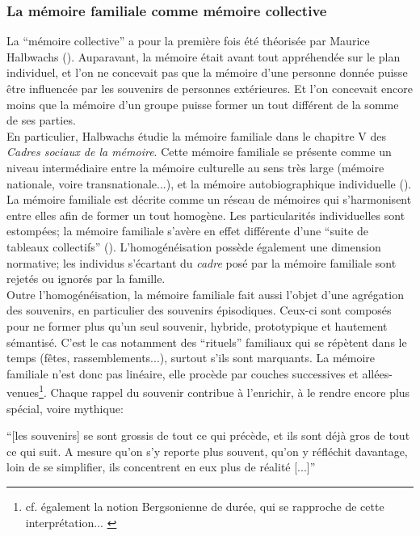 \documentclass[french]{article}
\begin{document}
		\subsubsection{La mémoire familiale comme mémoire collective}
			La ``mémoire collective'' a pour la première fois été théorisée par Maurice Halbwachs (\cite{halbwachs1925,halbwachs1950}). Auparavant, la mémoire était avant tout appréhendée sur le plan individuel, et l'on ne concevait pas que la mémoire d'une personne donnée puisse être influencée par les souvenirs de personnes extérieures. Et l'on concevait encore moins que la mémoire d'un groupe puisse former un tout différent de la somme de ses parties.\\
			En particulier, Halbwachs étudie la mémoire familiale dans le chapitre V des \textit{Cadres sociaux de la mémoire}.  Cette mémoire familiale se présente comme un niveau intermédiaire entre la mémoire culturelle au sens très large (mémoire nationale, voire transnationale...), et la mémoire autobiographique individuelle (\cite{boesen2012}). La mémoire familiale est décrite comme un réseau de mémoires qui s'harmonisent entre elles afin de former un tout homogène. Les particularités individuelles sont estompées; la mémoire familiale s'avère en effet différente d'une ``suite de tableaux collectifs'' (\cite[p.~110]{halbwachs1925}). L'homogénéisation possède également une dimension normative; les individus s'écartant du \textit{cadre} posé par la  mémoire familiale sont rejetés ou ignorés par la famille.\\
			Outre l'homogénéisation, la mémoire familiale fait aussi l'objet d'une agrégation des souvenirs, en particulier des souvenirs épisodiques. Ceux-ci sont composés pour ne former plus qu'un seul souvenir, hybride, prototypique et hautement sémantisé. C'est le cas notamment des ``rituels'' familiaux qui se répètent dans le temps (fêtes, rassemblements...), surtout s'ils sont marquants. La mémoire familiale n'est donc pas linéaire, elle procède par couches successives et allées-venues\footnote{cf. également la notion Bergsonienne de durée, qui se rapproche de cette interprétation... \cite[p.~5]{bergson1908}}. Chaque rappel du souvenir contribue à l'enrichir, à le rendre encore plus spécial, voire mythique:
			
			 \begin{minipage}{.7\textwidth}
			 	\centering
			 	``[les souvenirs] se sont grossis de tout ce qui précède, et ils sont déjà gros de tout ce qui suit. A mesure qu'on s'y reporte plus souvent, qu'on y réfléchit davantage, loin de se simplifier, ils concentrent en eux plus de réalité [...]'' \cite[p.~114]{halbwachs1925}
			 \end{minipage}
\end{document}
